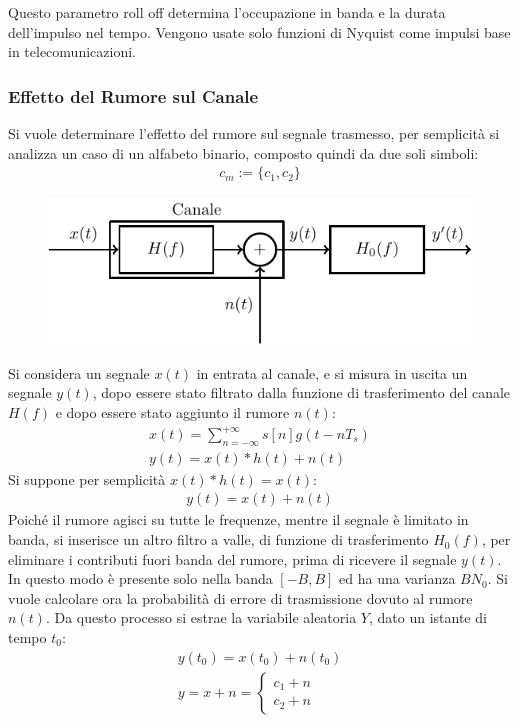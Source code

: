 \documentclass{article}
\numberwithin{equation}{subsection}
\begin{document}
Questo parametro roll off determina l'occupazione in banda e la durata dell'impulso nel tempo. Vengono usate solo funzioni di Nyquist come impulsi base 
in telecomunicazioni. 

\subsubsection{Effetto del Rumore sul Canale}

Si vuole determinare l'effetto del rumore sul segnale trasmesso, per semplicità si analizza un caso di un alfabeto binario, composto quindi da due soli simboli:
\begin{gather*}
    c_m:=\biggl\{c_1,c_2\biggr\}
\end{gather*}
\begin{figure}[H]%
    \centering
    \includegraphics{modulatore.pdf}
\end{figure}   
Si considera un segnale $x(t)$ in entrata al canale, e si misura in uscita un segnale $y(t)$, dopo essere stato filtrato dalla funzione di trasferimento del canale $H(f)$ 
e dopo essere stato aggiunto il rumore $n(t)$:
\begin{gather*}
    x(t)=\displaystyle\sum_{n=-\infty}^{+\infty}s[n]g(t-nT_s)\\
    y(t)=x(t)*h(t)+n(t)
\end{gather*}
Si suppone per semplicità $x(t)*h(t)=x(t)$:
\begin{gather*}
    y(t)=x(t)+n(t)
\end{gather*}
Poiché il rumore agisci su tutte le frequenze, mentre il segnale è limitato in banda, si inserisce un altro filtro a valle, di funzione di trasferimento $H_0(f)$, per 
eliminare i contributi fuori banda del rumore, prima di ricevere il segnale $y(t)$.
In questo modo è presente solo nella banda $[-B,B]$ ed ha una varianza $BN_0$. Si vuole calcolare ora la probabilità di errore di trasmissione dovuto al rumore $n(t)$. 
Da questo processo si estrae la variabile aleatoria $Y$, dato un istante di tempo $t_0$:
\begin{gather*}
    y(t_0)=x(t_0)+n(t_0)\\
    y=x+n=\begin{cases}
        c_1+n\\
        c_2+n
    \end{cases}
\end{gather*}
\end{document}

